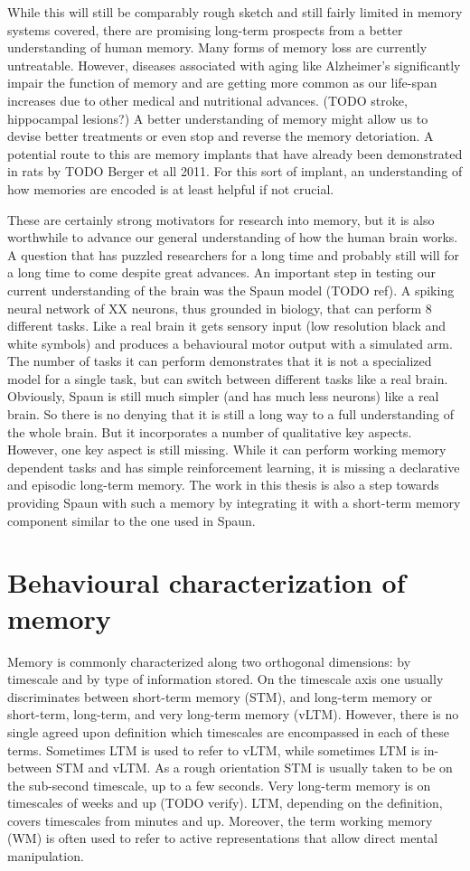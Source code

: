 While this will still be comparably rough sketch and still fairly limited in memory systems covered, there are promising long-term prospects from a better understanding of human memory.
Many forms of memory loss are currently untreatable.
However, diseases associated with aging like Alzheimer's significantly impair the function of memory and are getting more common as our life-span increases due to other medical and nutritional advances.
(TODO stroke, hippocampal lesions?)
A better understanding of memory might allow us to devise better treatments or even stop and reverse the memory detoriation.
A potential route to this are memory implants that have already been demonstrated in rats by TODO Berger et all 2011.
For this sort of implant, an understanding of how memories are encoded is at least helpful if not crucial.

These are certainly strong motivators for research into memory, but it is also worthwhile to advance our general understanding of how the human brain works.
A question that has puzzled researchers for a long time and probably still will for a long time to come despite great advances.
An important step in testing our current understanding of the brain was the Spaun model (TODO ref).
A spiking neural network of XX neurons, thus grounded in biology, that can perform 8 different tasks.
Like a real brain it gets sensory input (low resolution black and white symbols) and produces a behavioural motor output with a simulated arm.
The number of tasks it can perform demonstrates that it is not a specialized model for a single task, but can switch between different tasks like a real brain.
Obviously, Spaun is still much simpler (and has much less neurons) like a real brain.
So there is no denying that it is still a long way to a full understanding of the whole brain.
But it incorporates a number of qualitative key aspects.
However, one key aspect is still missing.
While it can perform working memory dependent tasks and has simple reinforcement learning, it is missing a declarative and episodic long-term memory.
The work in this thesis is also a step towards providing Spaun with such a memory by integrating it with a short-term memory component similar to the one used in Spaun.


\section{Behavioural characterization of memory}
Memory is commonly characterized along two orthogonal dimensions:
by timescale and by type of information stored.
On the timescale axis one usually discriminates between short-term memory (STM), and long-term memory or short-term, long-term, and very long-term memory (vLTM).
However, there is no single agreed upon definition which timescales are encompassed in each of these terms.
Sometimes LTM is used to refer to vLTM, while sometimes LTM is in-between STM and vLTM\@.
As a rough orientation STM is usually taken to be on the sub-second timescale, up to a few seconds.
Very long-term memory is on timescales of weeks and up (TODO verify).
LTM, depending on the definition, covers timescales from minutes and up.
Moreover, the term working memory (WM) is often used to refer to active representations that allow direct mental manipulation.

